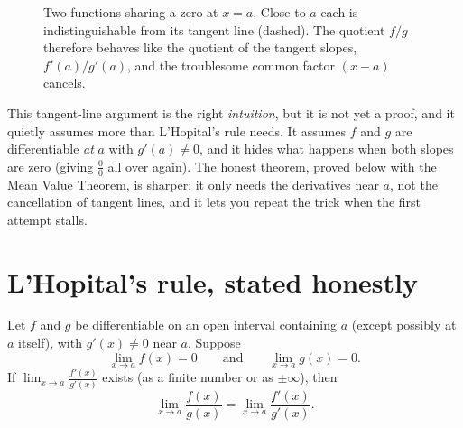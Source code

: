 \begin{figure}[H]
\centering
{}
\caption{Two functions sharing a zero at $x=a$. Close to $a$ each is
indistinguishable from its tangent line (dashed). The quotient $f/g$ therefore behaves
like the quotient of the tangent slopes, $f'(a)/g'(a)$, and the troublesome common
factor $(x-a)$ cancels.}
\label{ch18:fig-rates}
\end{figure}

\begin{trapbox}
This tangent-line argument is the right \emph{intuition}, but it is not yet a proof,
and it quietly assumes more than L'Hopital's rule needs. It assumes $f$ and $g$ are
differentiable \emph{at} $a$ with $g'(a)\neq 0$, and it hides what happens when both
slopes are zero (giving $\tfrac{0}{0}$ all over again). The honest theorem, proved
below with the Mean Value Theorem, is sharper: it only needs the derivatives near $a$,
not the cancellation of tangent lines, and it lets you repeat the trick when the first
attempt stalls.
\end{trapbox}

\section{L'Hopital's rule, stated honestly}

\begin{theorem}\label{ch18:thm-lhopital}
Let $f$ and $g$ be differentiable on an open interval containing $a$ (except possibly
at $a$ itself), with $g'(x)\neq 0$ near $a$. Suppose
\[
\lim_{x\to a}f(x)=0\qquad\text{and}\qquad \lim_{x\to a}g(x)=0.
\]
If $\displaystyle\lim_{x\to a}\frac{f'(x)}{g'(x)}$ exists (as a finite number or as
$\pm\infty$), then
\[
\lim_{x\to a}\frac{f(x)}{g(x)}=\lim_{x\to a}\frac{f'(x)}{g'(x)}.
\]
\end{theorem}

